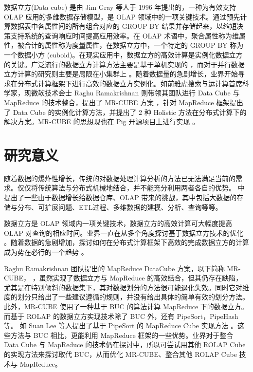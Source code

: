 数据立方(Data cube) \cite{gray1997data}是由 Jim Gray 等人于 1996 年提出的，一种为有效支持 OLAP 应用的多维数据存储模型，是 OLAP 领域中的一项关键技术。通过预先计算数据表中各属性间的所有组合对应的 GROUP BY 结果并存储起来，以缩短决策支持系统的查询响应时间提高应用效率。在 OLAP 术语中，聚合属性称为维属性，被合计的属性称为度量属性，在数据立方中，一个特定的 GROUP BY 称为一个数据小方 (cuboid)。在现实应用中，数据立方的高效计算是实例化数据立方的关键。广泛流行的数据立方计算方法主要是基于单机实现的 \cite{agarwal1996computation} \cite{beyer1999bottom}，而对于并行数据立方计算的研究则主要是局限在小集群上 \cite{ng2001iceberg} \cite{dehne2002parallelizing}。随着数据量的急剧增长，业界开始寻求在分布式计算框架下进行高效的数据立方实例化。如前雅虎搜索与运计算首席科学家，现微软技术会士 Raghu Ramakrishnan 则带领其团队进行 Data Cube 与 MapReduce 的技术整合，提出了 MR-CUBE 方案 \cite{nandi2012data} \cite{nandi2011distributed}，针对 MapReduce 框架提出了 Data Cube 的实例化计算方法，并提出了 2 种 Holistic 方法在分布式计算下的解决方案。MR-CUBE 的思想现也在 Pig 开源项目上进行实现 \cite{mrcubepig}。

\section{研究意义}

随着数据的爆炸性增长，传统的对数据处理计算分析的方法已无法满足当前的需求。仅仅将传统算法与分布式机械地结合，并不能充分利用两者各自的优势。\cite{cuzzocrea2011analytics} \cite{cuzzocrea2013data} \cite{cuzzocrea2013big} 中提出了一些由于数据增长给数据仓库、OLAP 带来的挑战，其中包括大数据的存储与分布、可扩展问题、ETL过程、多维数据的建模、分析、查询等等。

数据立方是 OLAP 领域内一项关键技术，数据立方的高效计算可大幅度提高 OLAP 对查询的相应时间。业界一直在从多个角度探讨基于数据立方技术的优化 \cite{xin2003star} \cite{harinarayan1996implementing} \cite{zhao1997array} \cite{han2001efficient} \cite{wang2002condensed}。随着数据的急剧增加，探讨如何在分布式计算框架下高效的完成数据立方的计算成为势在必行的一个趋势 \cite{abello2011building} \cite{wang2010mapreducemerge} \cite{sergey2009applying} \cite{lee2012efficient} \cite{wang2013scalable}。

Raghu Ramakrishnan 团队提出的 MapReduce DataCube 方案，以下简称 MR-CUBE， \cite{nandi2012data} \cite{nandi2011distributed}，虽然实现了数据立方与 MapReduce 的高效结合，但其仍存在缺陷，尤其是在特别倾斜的数据集下，其对数据划分的方法很可能退化失效。同时它对维度的划分只给出了一些建议遵循的规则，并没有给出具体的简单有效的划分方法。此外，MR-CUBE 使用了一种基于 BUC \cite{beyer1999bottom} 的算法计算 MapReduce 下的数据立方。而基于 ROLAP 的数据立方实现技术除了 BUC 外，还有 PipeSort，PipeHash \cite{agarwal1996computation} 等。 如 Suan Lee 等人提出了基于 PipeSort 的 MapReduce Cube 实现方法 \cite{lee2012efficient} 。这些方法与 BUC 相比，更能利用 MapReduce 框架的一些优势。业界对于整合 Data Cube 与 MapReduce 的技术仍在探讨中，所以可尝试用其他 ROLAP Cube 的实现方法来探讨取代 BUC，从而优化 MR-CUBE、整合其他 ROLAP Cube 技术与 MapReduce。



